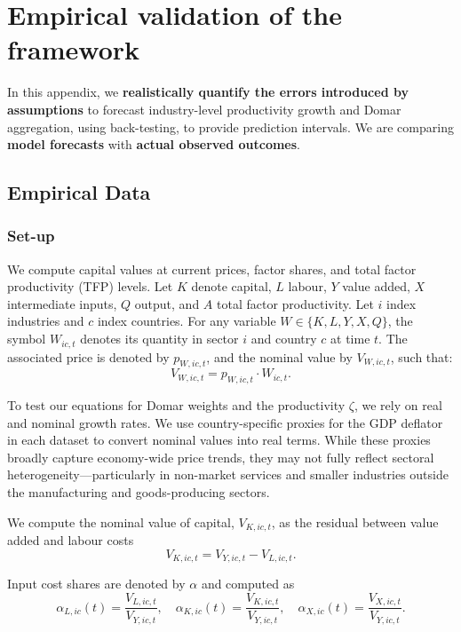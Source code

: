 \documentclass[11pt]{article}
\begin{document}
\section{Empirical validation of the framework}

In this appendix, we \textbf{realistically quantify the errors introduced by  assumptions} to forecast industry-level productivity growth and Domar aggregation, using back-testing, to provide prediction intervals. We are comparing \textbf{model forecasts} with \textbf{actual observed outcomes}.


\subsection{Empirical Data}
\label{sect_empirical_data}

\subsubsection{Set-up} 

We compute capital values at current prices, factor shares, and total factor productivity (TFP) levels. Let $K$ denote capital, $L$ labour, $Y$ value added, $X$ intermediate inputs, $Q$ output, and $A$ total factor productivity. Let 
$i$ index industries and $c$ index countries. For any variable $W \in \{K, L, Y, X, Q\}$, the symbol $W_{ic,t}$ denotes its quantity in sector $i$ and country $c$ at time $t$. The associated price is denoted by $p_{W,ic,t}$, and the nominal value by $V_{W,ic,t}$, such that:
\[
V_{W,ic,t} = p_{W,ic,t} \cdot W_{ic,t}.
\]

\noindent

To test our equations for Domar weights and the productivity $\zeta$, we rely on real and nominal growth rates. We use country-specific proxies for the GDP deflator in each dataset to convert nominal values into real terms. While these proxies broadly capture economy-wide price trends, they may not fully reflect sectoral heterogeneity—particularly in non-market services and smaller industries outside the manufacturing and goods-producing sectors.

\noindent
We compute the nominal value of capital, $V_{K,ic,t}$, as the residual between value added and labour costs
\begin{equation}
    V_{K,ic,t} = V_{Y,ic,t} - V_{L,ic,t}.
\end{equation}


\noindent
Input cost shares are denoted by $\alpha$ and computed as
\begin{equation}
    \alpha_{L,ic}(t) = \frac{V_{L,ic,t}}{V_{Y,ic,t}}, \quad
    \alpha_{K,ic}(t) = \frac{V_{K,ic,t}}{V_{Y,ic,t}}, \quad
    \alpha_{X,ic}(t) = \frac{V_{X,ic,t}}{V_{Y,ic,t}}.
\end{equation}
\end{document}
